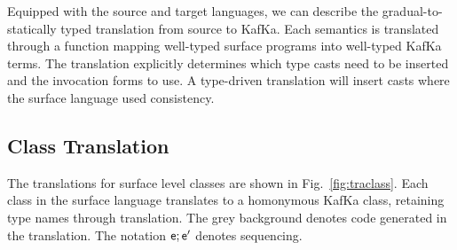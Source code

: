 \documentclass[a4paper,USenglish]{lipics-v2018}
\newcommand{\EM}[1]{\ensuremath{#1}\xspace}
\newcommand{\figref}[1]{Fig.~\ref{#1}\xspace}
\newcommand{\kafka}{{\sf KafKa}\xspace}
\begin{document}
\vspace{-7mm}

\noindent Equipped with the source and target languages, we can describe
the gradual-to-statically typed translation from source to \kafka.
Each semantics is translated through a function mapping well-typed
surface programs into well-typed \kafka terms. The translation
explicitly determines which type casts need to be inserted and the
invocation forms to use. A type-driven translation will insert casts
where the surface language used consistency.

\subsection{Class Translation}

The translations for surface level classes are shown in
\figref{fig:traclass}. Each class in the surface language translates to a
homonymous \kafka class, retaining type names through translation.
The grey background denotes code generated in the translation.
The notation \EM{\e;\ep} denotes sequencing. 
\end{document}
